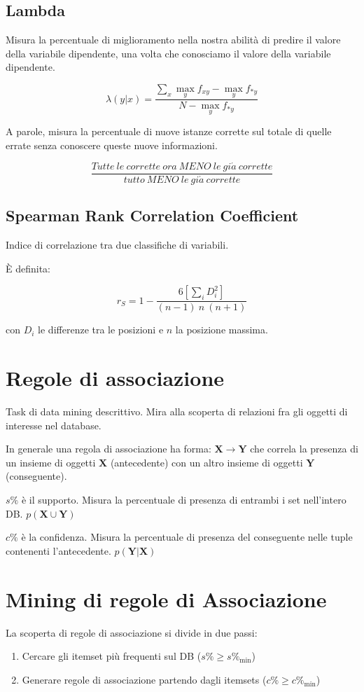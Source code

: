 \documentclass[11pt,onecolumn,a4paper,oneside]{book}
\begin{document}
\subsection{Lambda}
Misura la percentuale di miglioramento nella nostra abilità di predire il valore della variabile dipendente, una volta che conosciamo il valore della variabile dipendente.

$$\lambda(y|x) = \frac{\sum_x \max\limits_y f_{xy}-\max\limits_y f_{*y}}{N-\max\limits_y f_{*y}} $$

A parole, misura la percentuale di nuove istanze corrette sul totale di quelle errate senza conoscere queste nuove informazioni.

$$\frac{Tutte~le ~corrette ~ora~ MENO~ le~ gi\acute{a}~ corrette}{tutto~ MENO~ le~ gi\acute{a}~ corrette}$$

\subsection{Spearman Rank Correlation Coefficient}
Indice di correlazione tra due classifiche di variabili.

È definita:

$$ r_S = 1 - \frac{6\left[ \sum\limits_i D^2_i \right]}{\left( n -1 \right) ~ n ~ \left( n+1 \right)} $$

con $D_i$ le differenze tra le posizioni e $n$ la posizione massima.

	\section{Regole di associazione}
	Task di data mining descrittivo. Mira alla scoperta di relazioni fra gli oggetti di interesse nel database.
	
	In generale una regola di associazione ha forma:
	$\textbf{X} \rightarrow \mathbf{Y}$ che correla la presenza di un insieme di oggetti $\textbf{X}$ (antecedente) con un altro insieme di oggetti $\textbf{Y}$ (conseguente).
	
	$s\%$ è il supporto. Misura la percentuale di presenza di entrambi i set nell'intero DB. $p(\textbf{X} \cup \textbf{Y})$
	
	$c\%$ è la confidenza. Misura la percentuale di presenza del conseguente nelle tuple contenenti l'antecedente. $p( \textbf{Y} | \textbf{X} )$
	
	\section{Mining di regole di Associazione}
La scoperta di regole di associazione si divide in due passi:
\begin{enumerate}
\item Cercare gli itemset più frequenti sul DB ($s\% \geq s\%_{\min}$)
\item Generare regole di associazione partendo dagli itemsets ($c\% \geq c\%_{\min}$)
\end{enumerate}
	
\end{document}
